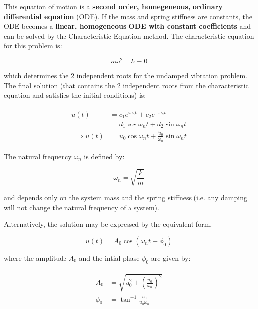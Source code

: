 \documentclass[10pt,b5paper,titlepage]{book}
\newenvironment{eqarray}
{
    \begin{eqnarray}
        \begin{aligned}
}
{
        \end{aligned}
    \end{eqnarray}
}
\begin{document}
This equation of motion is a
\textbf{second order, homegeneous, ordinary differential equation} (ODE). If the mass
and spring stiffness are constants, the ODE becomes a
\textbf{linear, homogeneous ODE with constant coefficients} and can be solved
by the Characteristic Equation method. The characteristic equation for this
problem is:

\begin{equation}
    m s^2 + k = 0
\end{equation}

which determines the 2 independent roots for the undamped vibration problem.
The final solution (that contains the 2 independent roots from the characteristic
equation and satisfies the initial conditions) is:

\begin{eqarray}
    u(t) &= c_1 e^{i \omega_n t} + c_2 e^{- \omega_n t}\\
         &= d_1 \cos{\omega_n t} + d_2 \sin{\omega_n t} \\
    \implies u(t) &= u_0 \cos{\omega_n t} + \frac{\dot{u}_0}{\omega_n} \sin{\omega_n t}
\end{eqarray}

The natural frequency $ \omega_n $ is defined by:

\begin{equation}
    \omega_n = \sqrt{\frac{k}{m}}
\end{equation}

and depends only on the system mass and the spring stiffness (i.e. any damping will
not change the natural frequency of a system).

Alternatively, the solution may be expressed by the equivalent form,

\begin{equation}
    u(t) = A_0 \cos{(\omega_n t - \phi_0)}
\end{equation}

where the amplitude $ A_0 $ and the intial phase $ \phi_0 $ are given by:

\begin{eqarray}
    A_0 &= \sqrt{u_0^2 + \left(\frac{\dot{u}_0}{\omega_n}\right)^2}\\
    \phi_0 &= \tan^{-1}\frac{\dot{u}_0}{u_0 \omega_n}
\end{eqarray}
\end{document}
